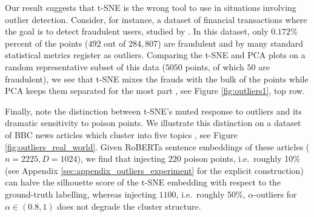 Our result suggests that t-SNE is the wrong tool to use in situations involving outlier detection. Consider, for instance, a dataset of financial transactions where the goal is to detect fraudulent users, studied by \citet{dalpozzolo2015_calib}. In this dataset, only \(0.172\)\% percent of the points ($492$ out of $284,807$) are fraudulent and by many standard statistical metrics register as outliers. Comparing the t-SNE and PCA plots on a  random representative subset of this data ($5050$ points, of which $50$ are fraudulent), we see that t-SNE mixes the frauds with the bulk of the points %
while PCA keeps them separated for the most part%
, see Figure \ref{fig:outliers1}, top row.

Finally, note the distinction between t-SNE's muted response to outliers and its dramatic sensitivity to poison points. We illustrate this distinction on a dataset of BBC news articles which cluster into five topics \citep{bbc_dataset}, see Figure \ref{fig:outliers_real_world}. Given RoBERTa \citep{liu2019roberta} sentence embeddings of these articles (\(n=2225, D=1024\)), we find that injecting $220$ poison points, i.e.\ roughly 10\% (see Appendix \ref{sec:appendix_outliers_experiment} for the explicit construction) can halve the silhouette score of the t-SNE embedding with respect to the ground-truth labelling, whereas injecting $1100$, i.e.\ roughly 50\%, $\alpha$-outliers for $\alpha \in (0.8,1)$ does not degrade the cluster structure. %






